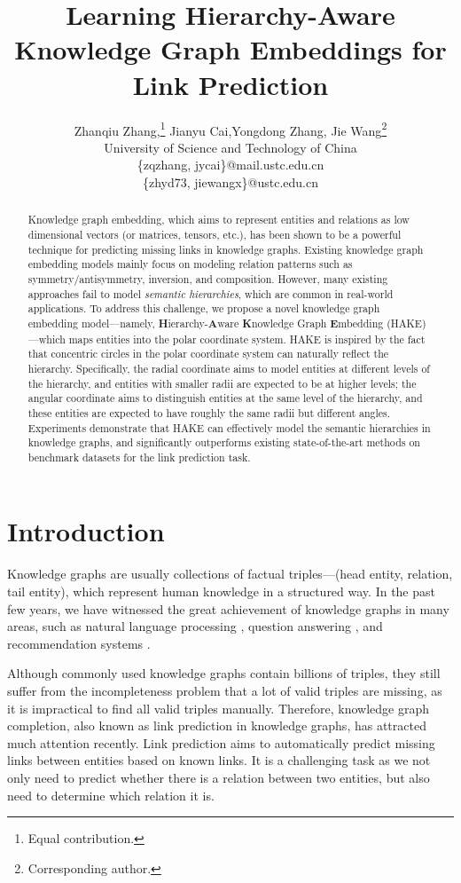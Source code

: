 \documentclass[letterpaper]{article} \usepackage{aaai20}  \usepackage{times}  \usepackage{helvet} \usepackage{courier}  \usepackage[hyphens]{url}  \usepackage{graphicx} \urlstyle{rm} \def\UrlFont{\rm}  \usepackage{graphicx}  \frenchspacing  \setlength{\pdfpagewidth}{8.5in}  \setlength{\pdfpageheight}{11in}
\title{Learning Hierarchy-Aware Knowledge Graph Embeddings for Link Prediction}
\author{Zhanqiu Zhang,\thanks{Equal contribution.} Jianyu Cai,\footnotemark[1] Yongdong Zhang, Jie Wang\thanks{Corresponding author.}\\
University of Science and Technology of China\\ 
\{zqzhang, jycai\}@mail.ustc.edu.cn\\
\{zhyd73, jiewangx\}@ustc.edu.cn
}
\newcommand{\citep}{\cite}
\begin{document}
\maketitle

\begin{abstract}
Knowledge graph embedding, which aims to represent entities and relations as low dimensional vectors (or matrices, tensors, etc.), has been shown to be a powerful technique for predicting missing links in knowledge graphs. Existing knowledge graph embedding models mainly focus on modeling relation patterns such as symmetry/antisymmetry, inversion, and composition. However, many existing approaches fail to model \textit{semantic hierarchies}, which are common in real-world applications. To address this challenge, we propose a novel knowledge graph embedding model---namely, \textbf{H}ierarchy-\textbf{A}ware \textbf{K}nowledge Graph \textbf{E}mbedding (HAKE)---which maps entities into the polar coordinate system. HAKE is inspired by the fact that concentric circles in the polar coordinate system can naturally reflect the hierarchy. Specifically, the radial coordinate aims to model entities at different levels of the hierarchy, and entities with smaller radii are expected to be at higher levels; the angular coordinate aims to distinguish entities at the same level of the hierarchy, and these entities are expected to have roughly the same radii but different angles. Experiments demonstrate that HAKE can effectively model the semantic hierarchies in knowledge graphs, and significantly outperforms existing state-of-the-art methods on benchmark datasets for the link prediction task. 
\end{abstract}


\section{Introduction}

Knowledge graphs are usually collections of factual triples---(head entity, relation, tail entity), which represent human knowledge in a structured way. In the past few years, we have witnessed the great achievement of knowledge graphs in many areas, such as natural language processing \citep{ernie}, question answering \citep{KGQA}, and recommendation systems \citep{KGRS}.


Although commonly used knowledge graphs contain billions of triples, they still suffer from the incompleteness problem that a lot of valid triples are missing, as it is impractical to find all valid triples manually. Therefore, knowledge graph completion, also known as link prediction in knowledge graphs, has attracted much attention recently. Link prediction aims to automatically predict missing links between entities based on known links. It is a challenging task as we not only need to predict whether there is a relation between two entities, but also need to determine which relation it is.
\end{document}
